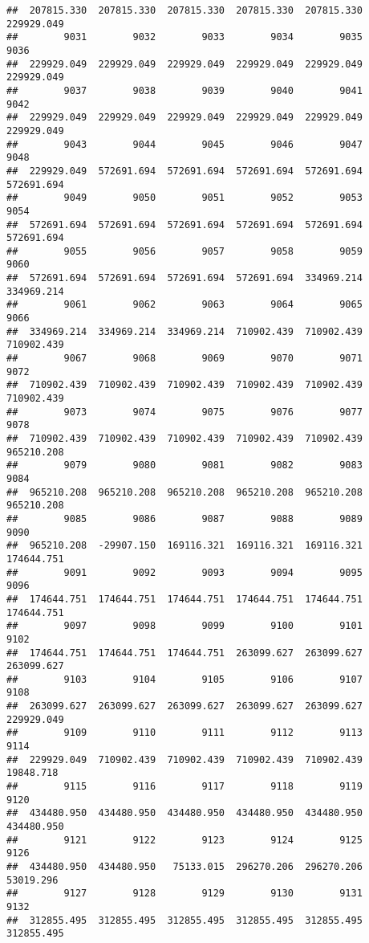 \documentclass[
]{book}
\begin{document}
\begin{verbatim}
##  207815.330  207815.330  207815.330  207815.330  207815.330  229929.049 
##        9031        9032        9033        9034        9035        9036 
##  229929.049  229929.049  229929.049  229929.049  229929.049  229929.049 
##        9037        9038        9039        9040        9041        9042 
##  229929.049  229929.049  229929.049  229929.049  229929.049  229929.049 
##        9043        9044        9045        9046        9047        9048 
##  229929.049  572691.694  572691.694  572691.694  572691.694  572691.694 
##        9049        9050        9051        9052        9053        9054 
##  572691.694  572691.694  572691.694  572691.694  572691.694  572691.694 
##        9055        9056        9057        9058        9059        9060 
##  572691.694  572691.694  572691.694  572691.694  334969.214  334969.214 
##        9061        9062        9063        9064        9065        9066 
##  334969.214  334969.214  334969.214  710902.439  710902.439  710902.439 
##        9067        9068        9069        9070        9071        9072 
##  710902.439  710902.439  710902.439  710902.439  710902.439  710902.439 
##        9073        9074        9075        9076        9077        9078 
##  710902.439  710902.439  710902.439  710902.439  710902.439  965210.208 
##        9079        9080        9081        9082        9083        9084 
##  965210.208  965210.208  965210.208  965210.208  965210.208  965210.208 
##        9085        9086        9087        9088        9089        9090 
##  965210.208  -29907.150  169116.321  169116.321  169116.321  174644.751 
##        9091        9092        9093        9094        9095        9096 
##  174644.751  174644.751  174644.751  174644.751  174644.751  174644.751 
##        9097        9098        9099        9100        9101        9102 
##  174644.751  174644.751  174644.751  263099.627  263099.627  263099.627 
##        9103        9104        9105        9106        9107        9108 
##  263099.627  263099.627  263099.627  263099.627  263099.627  229929.049 
##        9109        9110        9111        9112        9113        9114 
##  229929.049  710902.439  710902.439  710902.439  710902.439   19848.718 
##        9115        9116        9117        9118        9119        9120 
##  434480.950  434480.950  434480.950  434480.950  434480.950  434480.950 
##        9121        9122        9123        9124        9125        9126 
##  434480.950  434480.950   75133.015  296270.206  296270.206   53019.296 
##        9127        9128        9129        9130        9131        9132 
##  312855.495  312855.495  312855.495  312855.495  312855.495  312855.495 

\end{verbatim}
\end{document}
